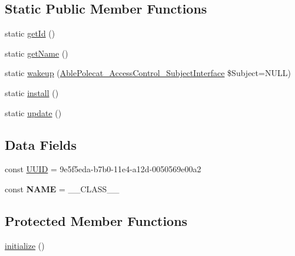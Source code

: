 \subsection*{Static Public Member Functions}
\begin{DoxyCompactItemize}
\item 
static \hyperlink{class_able_polecat___registry___class_library_acfaa3a96d0cb5a4c0d4d710dcba41e9e}{get\+Id} ()
\item 
static \hyperlink{class_able_polecat___registry___class_library_a4ef9bd37ba3ce8a13c1e8bcf4f72a630}{get\+Name} ()
\item 
static \hyperlink{class_able_polecat___registry___class_library_a3f2135f6ad45f51d075657f6d20db2cd}{wakeup} (\hyperlink{interface_able_polecat___access_control___subject_interface}{Able\+Polecat\+\_\+\+Access\+Control\+\_\+\+Subject\+Interface} \$Subject=N\+U\+L\+L)
\item 
static \hyperlink{class_able_polecat___registry___class_library_a7ee9452dbd39de4bfbe7a6dd9ed7bb65}{install} ()
\item 
static \hyperlink{class_able_polecat___registry___class_library_a00ce4d238d0651db584337f8e0b38c68}{update} ()
\end{DoxyCompactItemize}
\subsection*{Data Fields}
\begin{DoxyCompactItemize}
\item 
const \hyperlink{class_able_polecat___registry___class_library_a74b892c8c0b86bf9d04c5819898c51e7}{U\+U\+I\+D} = \textquotesingle{}9e5f5eda-\/b7b0-\/11e4-\/a12d-\/0050569e00a2\textquotesingle{}
\item 
\hypertarget{class_able_polecat___registry___class_library_a244352f035b82b20b0efa506167fd862}{}const {\bfseries N\+A\+M\+E} = \+\_\+\+\_\+\+C\+L\+A\+S\+S\+\_\+\+\_\+\label{class_able_polecat___registry___class_library_a244352f035b82b20b0efa506167fd862}

\end{DoxyCompactItemize}
\subsection*{Protected Member Functions}
\begin{DoxyCompactItemize}
\item 
\hyperlink{class_able_polecat___registry___class_library_a91098fa7d1917ce4833f284bbef12627}{initialize} ()
\end{DoxyCompactItemize}


